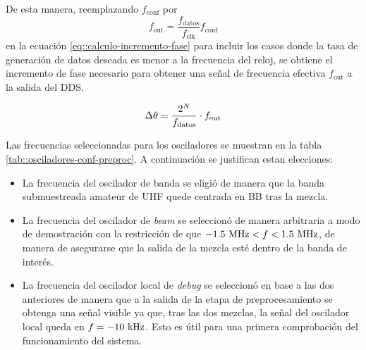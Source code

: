 \documentclass[../../main.tex]{subfiles}
\begin{document}
De esta manera, reemplazando $f_\textrm{conf}$ por \[f_\textrm{out} = \frac{f_\textrm{datos}}{f_\textrm{clk}}f_\textrm{conf}\] en la ecuación \ref{eq::calculo-incremento-fase} para incluir los casos donde la tasa de generación de datos deseada es menor a la frecuencia del reloj, se obtiene el incremento de fase necesario para obtener una señal de frecuencia efectiva $f_\textrm{out}$ a la salida del DDS.

\begin{equation}
    \Delta \theta = \frac{2^N}{f_\textrm{datos}} \cdot f_\textrm{out} \\
    \label{eq::calculo-incremento-fase-v2}
\end{equation}

Las frecuencias seleccionadas para los osciladores se muestran en la tabla \ref{tab::osciladores-conf-preproc}. A continuación se justifican estan elecciones:
\begin{itemize}
    \item La frecuencia del oscilador de banda se eligió de manera que la banda submuestreada amateur de UHF quede centrada en BB tras la mezcla.
    \item La frecuencia del oscilador de \textit{beam} se seleccionó de manera arbitraria a modo de demostración con la restricción de que $-1.5~\textrm{MHz}<f<1.5~\textrm{MHz}$, de manera de asegurarse que la salida de la mezcla esté dentro de la banda de interés.
    \item La frecuencia del oscilador local de \textit{debug} se seleccionó en base a las dos anteriores de manera que a la salida de la etapa de preprocesamiento se obtenga una señal visible ya que, tras las dos mezclas, la señal del oscilador local queda en $f = -10~\textrm{kHz}$. Esto es útil para una primera comprobación del funcionamiento del sistema.
\end{itemize}

\end{document}
